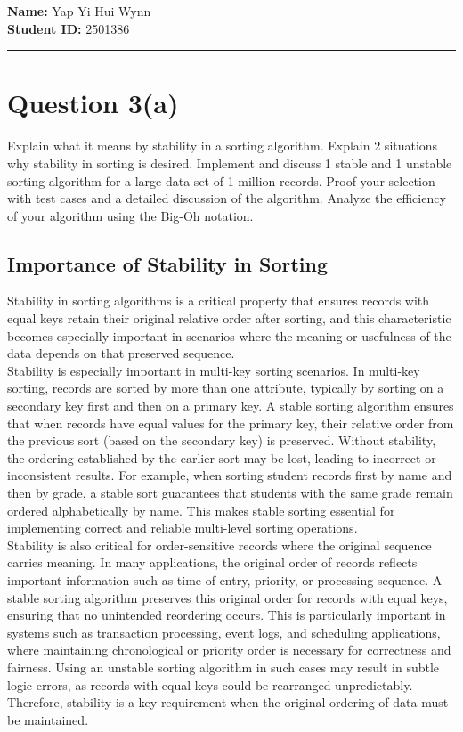 \documentclass[12pt]{article}
\begin{document}
\newpage
\noindent \textbf{Name:} Yap Yi Hui Wynn\\
\textbf{Student ID:} 2501386

\vspace{0.75em}
\hrule

\section{Question 3(a)}
Explain what it means by stability in a sorting algorithm. Explain 2 situations why stability in sorting is desired. Implement and discuss 1 stable and 1 unstable sorting algorithm for a large data set of 1 million records. Proof your selection with test cases and a detailed discussion of the algorithm. Analyze the efficiency of your algorithm using the Big-Oh notation. 

\subsection{Importance of Stability in Sorting}

Stability in sorting algorithms is a critical property that ensures records with equal keys retain their original relative order after sorting, and this characteristic becomes especially important in scenarios where the meaning or usefulness of the data depends on that preserved sequence.\\

Stability is especially important in multi-key sorting scenarios. In multi-key sorting, records are sorted by more than one attribute, typically by sorting on a secondary key first and then on a primary key. A stable sorting algorithm ensures that when records have equal values for the primary key, their relative order from the previous sort (based on the secondary key) is preserved. Without stability, the ordering established by the earlier sort may be lost, leading to incorrect or inconsistent results. For example, when sorting student records first by name and then by grade, a stable sort guarantees that students with the same grade remain ordered alphabetically by name. This makes stable sorting essential for implementing correct and reliable multi-level sorting operations\parencite{rizvi2024sorting_algorithms_in_focus}.\\

Stability is also critical for order-sensitive records where the original sequence carries meaning. In many applications, the original order of records reflects important information such as time of entry, priority, or processing sequence. A stable sorting algorithm preserves this original order for records with equal keys, ensuring that no unintended reordering occurs. This is particularly important in systems such as transaction processing, event logs, and scheduling applications, where maintaining chronological or priority order is necessary for correctness and fairness. Using an unstable sorting algorithm in such cases may result in subtle logic errors, as records with equal keys could be rearranged unpredictably. Therefore, stability is a key requirement when the original ordering of data must be maintained\parencite{rizvi2024sorting_algorithms_in_focus}.
\end{document}
